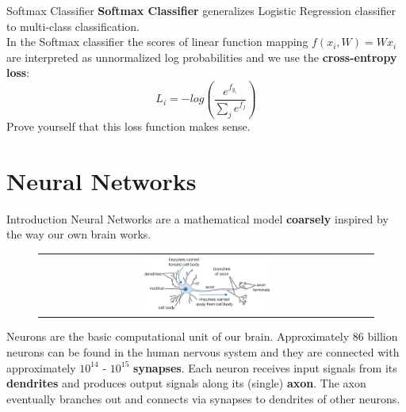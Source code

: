 \documentclass[aspectratio=169]{beamer}
\begin{document}

\begin{frame}{Softmax Classifier}
\textbf{Softmax Classifier} generalizes Logistic Regression classifier to multi-class classification.\\
\vspace{0.2cm}
In the Softmax classifier the scores of linear function mapping $f(x_i,W) = Wx_i$ are interpreted as unnormalized log probabilities and we use the \textbf{cross-entropy loss}:
\begin{equation*}
L_i = -log\left(\frac{e^{f_{y_{i}}}}{\sum_j e^{f_{j}}}\right)
\end{equation*}
\small{Prove yourself that this loss function makes sense.}

\end{frame}


\section{Neural Networks}

\begin{frame}{Introduction}
Neural Networks are a mathematical model \textbf{coarsely} inspired by the way our own brain works.
\begin{figure}
\begin{tabular}{c}
\includegraphics[width=0.4\textwidth]{img/dnn/biological_neuron.jpg}
\end{tabular}
\end{figure}
\small{Neurons are the basic computational unit of our brain. Approximately 86 billion neurons can be found in the human nervous system and they are connected with approximately $10^{14}$ - $10^{15}$ \textbf{synapses}. Each neuron receives input signals from its \textbf{dendrites} and produces output signals along its (single) \textbf{axon}. The axon eventually branches out and connects via synapses to dendrites of other neurons.}
\end{frame}
\end{document}
